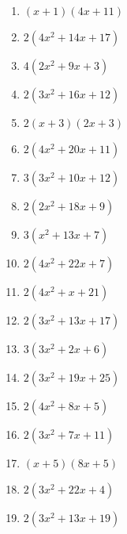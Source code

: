 \documentclass[9pt,dvipdfmx,a4paper]{article}
\begin{document}
\begin{multicols}{2}
\begin{enumerate}
\item
$ \left(x + 1\right) \left(4 x + 11\right)$

\item
$ 2 \left(4 x^{2} + 14 x + 17\right)$

\item
$ 4 \left(2 x^{2} + 9 x + 3\right)$

\item
$ 2 \left(3 x^{2} + 16 x + 12\right)$

\item
$ 2 \left(x + 3\right) \left(2 x + 3\right)$

\item
$ 2 \left(4 x^{2} + 20 x + 11\right)$

\item
$ 3 \left(3 x^{2} + 10 x + 12\right)$

\item
$ 2 \left(2 x^{2} + 18 x + 9\right)$

\item
$ 3 \left(x^{2} + 13 x + 7\right)$

\item
$ 2 \left(4 x^{2} + 22 x + 7\right)$

\item
$ 2 \left(4 x^{2} + x + 21\right)$

\item
$ 2 \left(3 x^{2} + 13 x + 17\right)$

\item
$ 3 \left(3 x^{2} + 2 x + 6\right)$

\item
$ 2 \left(3 x^{2} + 19 x + 25\right)$

\item
$ 2 \left(4 x^{2} + 8 x + 5\right)$

\item
$ 2 \left(3 x^{2} + 7 x + 11\right)$

\item
$ \left(x + 5\right) \left(8 x + 5\right)$

\item
$ 2 \left(3 x^{2} + 22 x + 4\right)$

\item
$ 2 \left(3 x^{2} + 13 x + 19\right)$


\end{enumerate}
\end{multicols}
\end{document}
